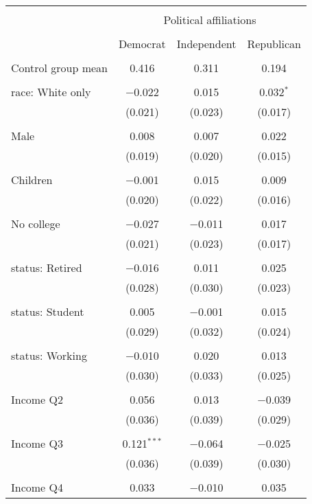 
\begin{tabular}{@{\extracolsep{5pt}}lccc} 
\\[-1.8ex]\hline 
\hline \\[-1.8ex] 
 & \multicolumn{3}{c}{Political affiliations} \\ 
\cline{2-4} 
\\[-1.8ex] & Democrat & Independent & Republican \\ 
\hline \\[-1.8ex] 
 Control group mean & 0.416 & 0.311 & 0.194  \\ \hline \\[-1.8ex] race: White only & $-$0.022 & 0.015 & 0.032$^{*}$ \\ 
  & (0.021) & (0.023) & (0.017) \\ 
  & & & \\ 
 Male & 0.008 & 0.007 & 0.022 \\ 
  & (0.019) & (0.020) & (0.015) \\ 
  & & & \\ 
 Children & $-$0.001 & 0.015 & 0.009 \\ 
  & (0.020) & (0.022) & (0.016) \\ 
  & & & \\ 
 No college & $-$0.027 & $-$0.011 & 0.017 \\ 
  & (0.021) & (0.023) & (0.017) \\ 
  & & & \\ 
 status: Retired & $-$0.016 & 0.011 & 0.025 \\ 
  & (0.028) & (0.030) & (0.023) \\ 
  & & & \\ 
 status: Student & 0.005 & $-$0.001 & 0.015 \\ 
  & (0.029) & (0.032) & (0.024) \\ 
  & & & \\ 
 status: Working & $-$0.010 & 0.020 & 0.013 \\ 
  & (0.030) & (0.033) & (0.025) \\ 
  & & & \\ 
 Income Q2 & 0.056 & 0.013 & $-$0.039 \\ 
  & (0.036) & (0.039) & (0.029) \\ 
  & & & \\ 
 Income Q3 & 0.121$^{***}$ & $-$0.064 & $-$0.025 \\ 
  & (0.036) & (0.039) & (0.030) \\ 
  & & & \\ 
 Income Q4 & 0.033 & $-$0.010 & 0.035 \\ 

\end{tabular}
